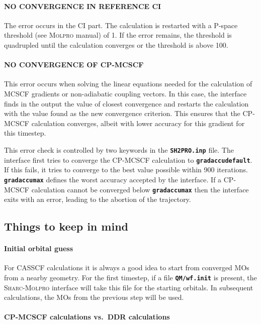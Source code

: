 \documentclass[a4paper,11pt,DIV=15,openany,twoside=false]{scrbook}
\newcommand{\sharc}{\textsc{Sharc}}
\newcommand{\ttt}[1]{\textbf{\texttt{#1}}}
\begin{document}
\paragraph{NO CONVERGENCE IN REFERENCE CI} The error occurs in the CI part. The calculation is restarted with a P-space threshold (see \textsc{Molpro} manual) of 1. If the error remains, the threshold is quadrupled until the calculation converges or the threshold is above 100.

\paragraph{NO CONVERGENCE OF CP-MCSCF} This error occurs when solving the linear equations needed for the calculation of MCSCF gradients or non-adiabatic coupling vectors. In this case, the interface finds in the output the value of closest convergence and restarts the calculation with the value found as the new convergence criterion. This ensures that the CP-MCSCF calculation converges, albeit with lower accuracy for this gradient for this timestep.

This error check is controlled by two keywords in the \ttt{SH2PRO.inp} file. The interface first tries to converge the CP-MCSCF calculation to \ttt{gradaccudefault}. If this fails, it tries to converge to the best value possible within 900 iterations. \ttt{gradaccumax} defines the worst accuracy accepted by the interface. If a CP-MCSCF calculation cannot be converged below \ttt{gradaccumax} then the interface exits with an error, leading to the abortion of the trajectory.

\subsection{Things to keep in mind}

\paragraph{Initial orbital guess}

For CASSCF calculations it is always a good idea to start from converged MOs from a nearby geometry. For the first timestep, if a file \ttt{QM/wf.init} is present, the \sharc-\textsc{Molpro} interface will take this file for the starting orbitals. In subsequent calculations, the MOs from the previous step will be used.

\paragraph{CP-MCSCF calculations vs.\ DDR calculations}
\end{document}
